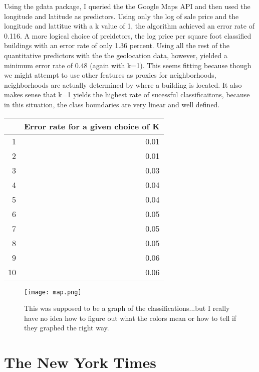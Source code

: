 \documentclass{article}
\begin{document}
Using the gdata package, I queried the the Google Maps API and then used the longitude and latitude as predictors.  Using only the log of sale price and the longitude and lattitue with a k value of 1, the algorithm achieved an error rate of 0.116.  A more logical choice of preidctors, the  log price per square foot classified buildings with an error rate of only 1.36 percent.  Using all the rest of the quantitative predictors with the the geolocation data, however, yielded a minimum error rate of 0.48 (again with k=1).  This seems fitting because though we might attempt to use other features as proxies for neighborhoods, neighborhoods are actually determined by where a building is located.  It also makes sense that k=1 yields the highest rate of sucessful classificaitons, because in this situation, the class boundaries are very linear and well defined.
\begin{table}[ht]
\begin{center}
\begin{tabular}{rr}
  \hline
 & Error rate for a given choice of K \\ 
  \hline
1 & 0.01 \\ 
  2 & 0.01 \\ 
  3 & 0.03 \\ 
  4 & 0.04 \\ 
  5 & 0.04 \\ 
  6 & 0.05 \\ 
  7 & 0.05 \\ 
  8 & 0.05 \\ 
  9 & 0.06 \\ 
  10 & 0.06 \\ 
   \hline
\end{tabular}
\end{center}
\end{table}

\begin{figure}[H]
\begin{center}
\texttt{[image: map.png]}
\caption{This was supposed to be a graph of the classifications...but I really have no idea how to figure out what the colors mean or how to tell if they graphed the right way.}
\end{center}
\end{figure}


\section{The New York Times}
\end{document}
